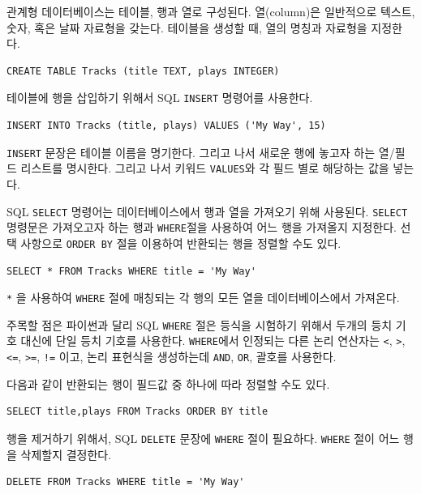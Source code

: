 관계형 데이터베이스는 테이블, 행과 열로 구성된다. 
열(column)은 일반적으로 텍스트, 숫자, 혹은 날짜 자료형을 갖는다.
테이블을 생성할 때, 열의 명칭과 자료형을 지정한다.

\beforeverb
\begin{verbatim}
CREATE TABLE Tracks (title TEXT, plays INTEGER)
\end{verbatim}
\afterverb
%

테이블에 행을 삽입하기 위해서 SQL {\tt INSERT} 명령어를 사용한다.

\beforeverb
\begin{verbatim}
INSERT INTO Tracks (title, plays) VALUES ('My Way', 15)
\end{verbatim}
\afterverb
%

{\tt INSERT} 문장은 테이블 이름을 명기한다.
그리고 나서 새로운 행에 놓고자 하는 열/필드 리스트를 명시한다.
그리고 나서 키워드 {\tt VALUES}와 각 필드 별로 해당하는 값을 넣는다.

SQL {\tt SELECT} 명령어는 데이터베이스에서 행과 열을 가져오기 위해 사용된다.
{\tt SELECT} 명령문은 가져오고자 하는 행과 {\tt WHERE}절을 사용하여 어느 행을 가져올지 지정한다.
선택 사항으로 {\tt ORDER BY} 절을 이용하여 반환되는 행을 정렬할 수도 있다.

\beforeverb
\begin{verbatim}
SELECT * FROM Tracks WHERE title = 'My Way'
\end{verbatim}
\afterverb
%

\verb"*" 을 사용하여 {\tt WHERE} 절에 매칭되는 각 행의 모든 열을 데이터베이스에서 가져온다.

주목할 점은 파이썬과 달리 SQL {\tt WHERE} 절은 등식을 시험하기 위해서 두개의 등치 기호 대신에 단일 등치 기호를 사용한다.
{\tt WHERE}에서 인정되는 다른 논리 연산자는 
\verb"<",
\verb">",
\verb"<=",
\verb">=",
\verb"!=" 이고, 논리 표현식을 생성하는데 {\tt AND}, {\tt OR}, 괄호를 사용한다.

다음과 같이 반환되는 행이 필드값 중 하나에 따라 정렬할 수도 있다.

\beforeverb
\begin{verbatim}
SELECT title,plays FROM Tracks ORDER BY title
\end{verbatim}
\afterverb
%

행을 제거하기 위해서, SQL {\tt DELETE} 문장에 {\tt WHERE} 절이 필요하다.
{\tt WHERE} 절이 어느 행을 삭제할지 결정한다.

\beforeverb
\begin{verbatim}
DELETE FROM Tracks WHERE title = 'My Way'
\end{verbatim}
\afterverb
%

